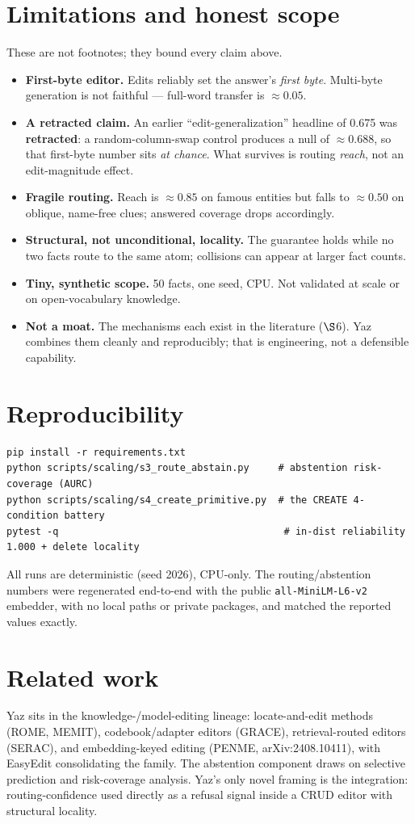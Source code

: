 \documentclass[11pt]{article}
\begin{document}
\section{Limitations and honest scope}
These are not footnotes; they bound every claim above.
\begin{itemize}
\item \textbf{First-byte editor.} Edits reliably set the answer's \emph{first byte}. Multi-byte
generation is not faithful --- full-word transfer is $\approx 0.05$.
\item \textbf{A retracted claim.} An earlier ``edit-generalization'' headline of 0.675 was
\textbf{retracted}: a random-column-swap control produces a null of $\approx 0.688$, so that first-byte
number sits \emph{at chance}. What survives is routing \emph{reach}, not an edit-magnitude effect.
\item \textbf{Fragile routing.} Reach is $\approx 0.85$ on famous entities but falls to $\approx 0.50$
on oblique, name-free clues; answered coverage drops accordingly.
\item \textbf{Structural, not unconditional, locality.} The guarantee holds while no two facts route to
the same atom; collisions can appear at larger fact counts.
\item \textbf{Tiny, synthetic scope.} 50 facts, one seed, CPU. Not validated at scale or on
open-vocabulary knowledge.
\item \textbf{Not a moat.} The mechanisms each exist in the literature ($\S$6). Yaz combines them
cleanly and reproducibly; that is engineering, not a defensible capability.
\end{itemize}

\section{Reproducibility}
\begin{verbatim}
pip install -r requirements.txt
python scripts/scaling/s3_route_abstain.py     # abstention risk-coverage (AURC)
python scripts/scaling/s4_create_primitive.py  # the CREATE 4-condition battery
pytest -q                                       # in-dist reliability 1.000 + delete locality
\end{verbatim}
All runs are deterministic (seed 2026), CPU-only. The routing/abstention numbers were regenerated
end-to-end with the public \texttt{all-MiniLM-L6-v2} embedder, with no local paths or private packages,
and matched the reported values exactly.

\section{Related work}
Yaz sits in the knowledge-/model-editing lineage: locate-and-edit methods (ROME, MEMIT),
codebook/adapter editors (GRACE), retrieval-routed editors (SERAC), and embedding-keyed editing (PENME,
arXiv:2408.10411), with EasyEdit consolidating the family. The abstention component draws on selective
prediction and risk-coverage analysis. Yaz's only novel framing is the integration: routing-confidence
used directly as a refusal signal inside a CRUD editor with structural locality.
\end{document}
